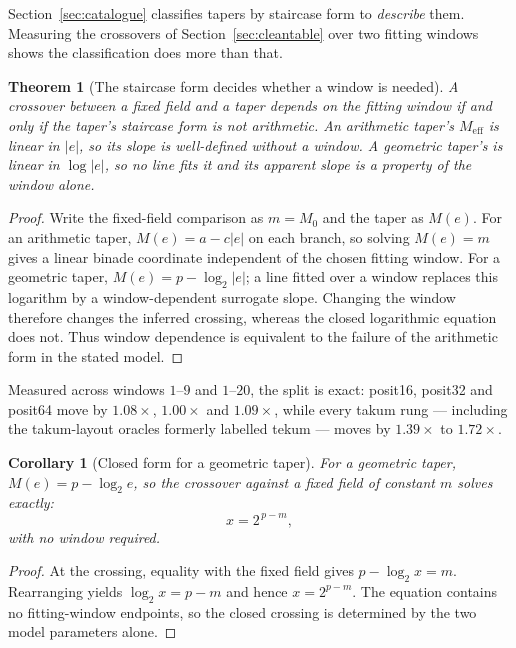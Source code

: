 \documentclass[11pt]{article}
\newtheorem{theorem}{Theorem}
\newtheorem{corollary}{Corollary}
\theoremstyle{definition}
\begin{document}
\label{sec:formprescribes}

Section~\ref{sec:catalogue} classifies tapers by staircase form to \emph{describe}
them. Measuring the crossovers of Section~\ref{sec:cleantable} over two fitting
windows shows the classification does more than that.

\begin{theorem}[The staircase form decides whether a window is needed]
\label{thm:formwindow}
A crossover between a fixed field and a taper depends on the fitting window if
and only if the taper's staircase form is not arithmetic. An arithmetic taper's
$M_{\mathrm{eff}}$ is linear in $|e|$, so its slope is well-defined without a
window. A geometric taper's is linear in $\log|e|$, so no line fits it and its
apparent slope is a property of the window alone.
\end{theorem}
\begin{proof}
Write the fixed-field comparison as $m=M_0$ and the taper as $M(e)$.
For an arithmetic taper, $M(e)=a-c|e|$ on each branch, so solving
$M(e)=m$ gives a linear binade coordinate independent of the chosen fitting
window.  For a geometric taper, $M(e)=p-\log_2|e|$; a line fitted over
a window replaces this logarithm by a window-dependent surrogate slope.
Changing the window therefore changes the inferred crossing, whereas the
closed logarithmic equation does not.  Thus window dependence is equivalent
to the failure of the arithmetic form in the stated model.
\end{proof}

Measured across windows $1$--$9$ and $1$--$20$, the split is exact: posit16,
posit32 and posit64 move by $1.08\times$, $1.00\times$ and $1.09\times$, while
every takum rung --- including the takum-layout oracles formerly labelled
tekum --- moves by $1.39\times$ to $1.72\times$.

\begin{corollary}[Closed form for a geometric taper]
\label{cor:geomcross}
For a geometric taper, $M(e) = p - \log_2 e$, so the crossover against a fixed
field of constant $m$ solves exactly:
\[
  x = 2^{\,p-m},
\]
with no window required.
\end{corollary}
\begin{proof}
At the crossing, equality with the fixed field gives
$p-\log_2 x=m$.  Rearranging yields $\log_2 x=p-m$ and hence
$x=2^{p-m}$.  The equation contains no fitting-window endpoints, so the
closed crossing is determined by the two model parameters alone.
\end{proof}
\end{document}
